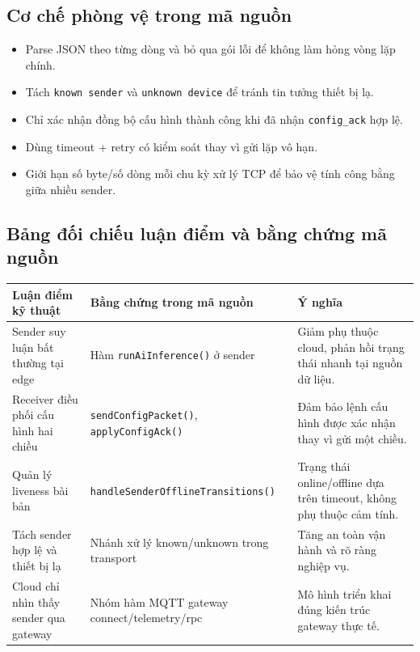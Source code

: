 \documentclass[12pt,a4paper]{report}
\begin{document}
\subsection{Cơ chế phòng vệ trong mã nguồn}
\begin{itemize}
    \item Parse JSON theo từng dòng và bỏ qua gói lỗi để không làm hỏng vòng lặp chính.
    \item Tách \texttt{known sender} và \texttt{unknown device} để tránh tin tưởng thiết bị lạ.
    \item Chỉ xác nhận đồng bộ cấu hình thành công khi đã nhận \texttt{config\_ack} hợp lệ.
    \item Dùng timeout + retry có kiểm soát thay vì gửi lặp vô hạn.
    \item Giới hạn số byte/số dòng mỗi chu kỳ xử lý TCP để bảo vệ tính công bằng giữa nhiều sender.
\end{itemize}

\subsection{Bảng đối chiếu luận điểm và bằng chứng mã nguồn}
\begin{longtable}{p{}p{}p{}}
\toprule
Luận điểm kỹ thuật & Bằng chứng trong mã nguồn & Ý nghĩa \\
\midrule
\endhead
Sender suy luận bất thường tại edge & Hàm \texttt{runAiInference()} ở sender & Giảm phụ thuộc cloud, phản hồi trạng thái nhanh tại nguồn dữ liệu. \\
Receiver điều phối cấu hình hai chiều & \texttt{sendConfigPacket()}, \texttt{applyConfigAck()} & Đảm bảo lệnh cấu hình được xác nhận thay vì gửi một chiều. \\
Quản lý liveness bài bản & {\small\texttt{handleSender\-OfflineTransitions()}} & Trạng thái online/offline dựa trên timeout, không phụ thuộc cảm tính. \\
Tách sender hợp lệ và thiết bị lạ & Nhánh xử lý known/unknown trong transport & Tăng an toàn vận hành và rõ ràng nghiệp vụ. \\
Cloud chỉ nhìn thấy sender qua gateway & Nhóm hàm MQTT gateway connect/telemetry/rpc & Mô hình triển khai đúng kiến trúc gateway thực tế. \\
\bottomrule
\end{longtable}
\end{document}
